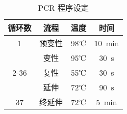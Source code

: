 \documentclass{ctexart}
\begin{document}
    \begin{table}[!htb]
        \centering
        \caption{PCR 程序设定}
        \begin{tabular}{cccc}
            \toprule
            循环数 & 流程 & 温度 & 时间\\
            \midrule
            1 & 预变性 & 98℃ & 10~min\\
            & 变性 & 95℃ & 30~s\\
            2-36 & 复性 & 55℃ & 30~s\\
            & 延伸 & 72℃ & 90~s\\
            37 & 终延伸 & 72℃ & 5~min\\
            \bottomrule
        \end{tabular}
    \end{table}
\end{document}
